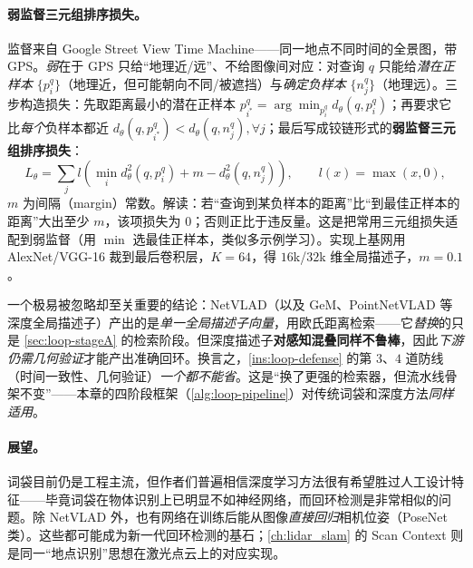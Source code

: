\paragraph{弱监督三元组排序损失。}
监督来自 Google Street View Time Machine——同一地点不同时间的全景图，带 GPS\cite{arandjelovic2016netvlad}。\emph{弱}在于 GPS 只给“地理近/远”、不给图像间对应：对查询 $q$ 只能给\emph{潜在正样本} $\{p_i^q\}$（地理近，但可能朝向不同/被遮挡）与\emph{确定负样本} $\{n_j^q\}$（地理远）。三步构造损失：先取距离最小的潜在正样本 $p_{i^\ast}^q=\arg\min_{p_i^q}d_\theta(q,p_i^q)$；再要求它比\emph{每个}负样本都近 $d_\theta(q,p_{i^\ast}^q)<d_\theta(q,n_j^q),\forall j$；最后写成铰链形式的\textbf{弱监督三元组排序损失}：
\begin{equation}
  L_\theta=\sum_j l\!\left(\min_i d_\theta^2(q,p_i^q)+m-d_\theta^2(q,n_j^q)\right),\qquad l(x)=\max(x,0),
  \label{eq:loop-triplet}
\end{equation}
$m$ 为间隔（margin）常数。解读：若“查询到某负样本的距离”比“到最佳正样本的距离”大出至少 $m$，该项损失为 $0$；否则正比于违反量。这是把常用三元组损失适配到弱监督（用 $\min$ 选最佳正样本，类似多示例学习）。实现上基网用 AlexNet/VGG-16 裁到最后卷积层，$K=64$，得 $16$k/$32$k 维全局描述子，$m=0.1$。

\begin{insight}[深度描述子仍需几何验证]\label{ins:loop-dl-geo}
一个极易被忽略却至关重要的结论\cite{arandjelovic2016netvlad}：NetVLAD（以及 GeM、PointNetVLAD 等深度全局描述子）产出的是\emph{单一全局描述子向量}，用欧氏距离检索——它\emph{替换}的只是 \cref{sec:loop-stageA} 的检索阶段。但深度描述子\textbf{对感知混叠同样不鲁棒}，因此\emph{下游仍需几何验证}才能产出准确回环。换言之，\cref{ins:loop-defense} 的第 $3$、$4$ 道防线（时间一致性、几何验证）\emph{一个都不能省}。这是“换了更强的检索器，但流水线骨架不变”——本章的四阶段框架（\cref{alg:loop-pipeline}）对传统词袋和深度方法\emph{同样适用}。
\end{insight}

\paragraph{展望。}
词袋目前仍是工程主流，但作者们普遍相信深度学习方法很有希望胜过人工设计特征\cite{gaoxiang2019slam14}——毕竟词袋在物体识别上已明显不如神经网络，而回环检测是非常相似的问题。除 NetVLAD 外，也有网络在训练后能从图像\emph{直接回归}相机位姿（PoseNet 类\cite{kendall2015posenet}）。这些都可能成为新一代回环检测的基石；\cref{ch:lidar_slam} 的 Scan Context\cite{kim2018scancontext} 则是同一“地点识别”思想在激光点云上的对应实现。

